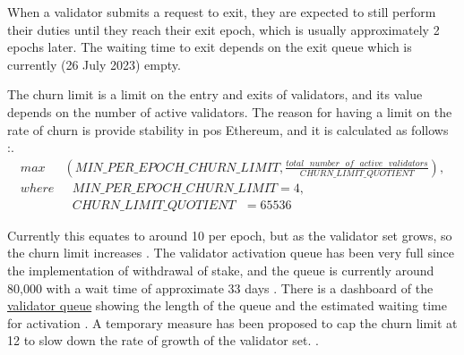\documentclass[UTF8]{article}
\begin{document}
When a validator submits a request to exit, they are expected to still perform their duties until they reach their exit epoch, which is usually approximately 2 epochs later. The waiting time to exit depends on the exit queue which is currently (26 July 2023) empty. 

The churn limit is a limit on the entry and exits of validators, and its value depends on the number of active validators. The reason for having a limit on the rate of churn is provide stability in \gls{pos} Ethereum, and it is calculated as follows \cite{Edgington2023}:.
\begin{equation*}
\begin{aligned}
max & \left( MIN\_PER\_EPOCH\_CHURN\_LIMIT, \frac{total \texttt{ } number  \texttt{ } of  \texttt{ } active  \texttt{ } validators}{CHURN\_LIMIT\_QUOTIENT} \right),\\
where & \texttt{ }  MIN\_PER\_EPOCH\_CHURN\_LIMIT = 4, \\
 &  \texttt{ } CHURN\_LIMIT\_QUOTIENT  \texttt{              }= 65536
\end{aligned}
\end{equation*}

Currently this equates to around 10 per epoch, but as the validator set grows, so the churn limit increases \cite{liquid2023}.
The validator activation queue has been very full since the implementation of withdrawal of stake, and the queue is currently around 80,000 with a wait time of approximate 33 days \cite{ea2023q}. 
There is a dashboard of the \href{https://www.validatorqueue.com/}{validator queue} showing the length of the queue and the estimated waiting time for activation \cite{ea2023q}.
A temporary measure has been proposed to cap the churn limit at 12 to slow down the rate of growth of the validator set. \cite{dapplion}.

\end{document}
